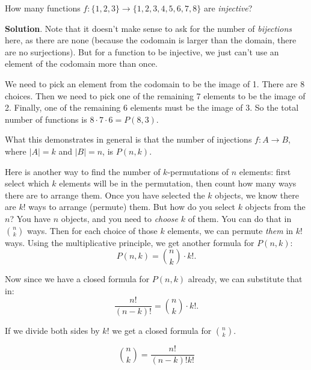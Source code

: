 \documentclass[11pt,]{book}
\theoremstyle{ptxplainnotitle}
\theoremstyle{ptxplaintitle}
\theoremstyle{ptxdefinitionnotitle}
\theoremstyle{ptxdefinitiontitle}
\theoremstyle{ptxdefinitionnotitle}
\theoremstyle{ptxdefinitiontitle}
\theoremstyle{ptxdefinitionnotitle}
\theoremstyle{ptxdefinitiontitle}
\theoremstyle{ptxdefinitiontitlenonumber}
\theoremstyle{ptxdefinitiontitlenonumber}
\numberwithin{equation}{chapter}
\newcommand{\card}[1]{\left| #1 \right|}
\begin{document}
\begin{example}\label{example-counting-functions-injective}
\hypertarget{p-1531}{}%
How many functions \(f:\{1,2,3\} \to \{1,2,3,4,5,6,7,8\}\) are \emph{injective}?%
\par\smallskip%
\noindent\textbf{Solution}.\hypertarget{solution-202}{}\quad%
\hypertarget{p-1532}{}%
Note that it doesn't make sense to ask for the number of \emph{bijections} here, as there are none (because the codomain is larger than the domain, there are no surjections). But for a function to be injective, we just can't use an element of the codomain more than once.%
\par
\hypertarget{p-1533}{}%
We need to pick an element from the codomain to be the image of 1. There are 8 choices. Then we need to pick one of the remaining 7 elements to be the image of 2. Finally, one of the remaining 6 elements must be the image of 3. So the total number of functions is \(8\cdot 7 \cdot 6 = P(8,3)\).%
\par
\hypertarget{p-1534}{}%
What this demonstrates in general is that the number of injections \(f:A \to B\), where \(\card{A} = k\) and \(\card{B} = n\), is \(P(n,k)\).%
\end{example}
\hypertarget{p-1535}{}%
Here is another way to find the number of \(k\)-permutations of \(n\) elements: first select which \(k\) elements will be in the permutation, then count how many ways there are to arrange them. Once you have selected the \(k\) objects, we know there are \(k!\) ways to arrange (permute) them. But how do you select \(k\) objects from the \(n\)? You have \(n\) objects, and you need to \emph{choose} \(k\) of them. You can do that in \({n \choose k}\) ways. Then for each choice of those \(k\) elements, we can permute \emph{them} in \(k!\) ways. Using the multiplicative principle, we get another formula for \(P(n,k)\):%
\begin{equation*}
P(n,k) = {n \choose k}\cdot k!.
\end{equation*}
%
\par
\hypertarget{p-1536}{}%
Now since we have a closed formula for \(P(n,k)\) already, we can substitute that in:%
\begin{equation*}
\frac{n!}{(n-k)!} = {n \choose k} \cdot k!.
\end{equation*}
%
\par
\hypertarget{p-1537}{}%
If we divide both sides by \(k!\) we get a closed formula for \({n \choose k}\).%
\begin{assemblage}\label{assemblage-23}
\hypertarget{p-1538}{}%
%
\begin{equation*}
{n \choose k} = \frac{n!}{(n-k)!k!}
\end{equation*}
%
\end{assemblage}
\end{document}
